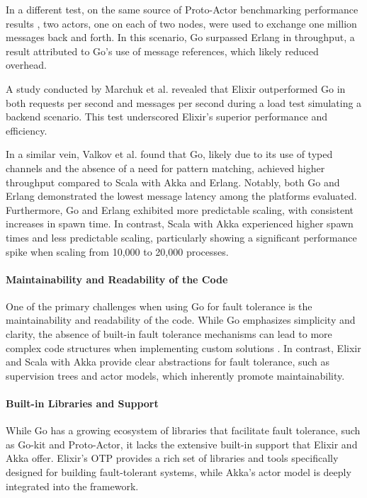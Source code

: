 In a different test, on the same source of Proto-Actor benchmarking performance results \cite{proto-actor-docs}, two actors, one on each of two nodes, were used to exchange one million messages back and forth. In this scenario, Go surpassed Erlang in throughput, a result attributed to Go’s use of message references, which likely reduced overhead.

A study conducted by Marchuk et al. \cite{Marchuk2023} revealed that Elixir outperformed Go in both requests per second and messages per second during a load test simulating a backend scenario. This test underscored Elixir's superior performance and efficiency.

In a similar vein, Valkov et al. \cite{Valkov2018} found that Go, likely due to its use of typed channels and the absence of a need for pattern matching, achieved higher throughput compared to Scala with Akka and Erlang. Notably, both Go and Erlang demonstrated the lowest message latency among the platforms evaluated. Furthermore, Go and Erlang exhibited more predictable scaling, with consistent increases in spawn time. In contrast, Scala with Akka experienced higher spawn times and less predictable scaling, particularly showing a significant performance spike when scaling from 10,000 to 20,000 processes.

\paragraph{Maintainability and Readability of the Code} One of the primary challenges when using Go for fault tolerance is the maintainability and readability of the code. While Go emphasizes simplicity and clarity, the absence of built-in fault tolerance mechanisms can lead to more complex code structures when implementing custom solutions \cite{go-docs}. In contrast, Elixir and Scala with Akka provide clear abstractions for fault tolerance, such as supervision trees and actor models, which inherently promote maintainability.

\paragraph{Built-in Libraries and Support} While Go has a growing ecosystem of libraries that facilitate fault tolerance, such as Go-kit and Proto-Actor, it lacks the extensive built-in support that Elixir and Akka offer. Elixir's OTP provides a rich set of libraries and tools specifically designed for building fault-tolerant systems, while Akka's actor model is deeply integrated into the framework.

